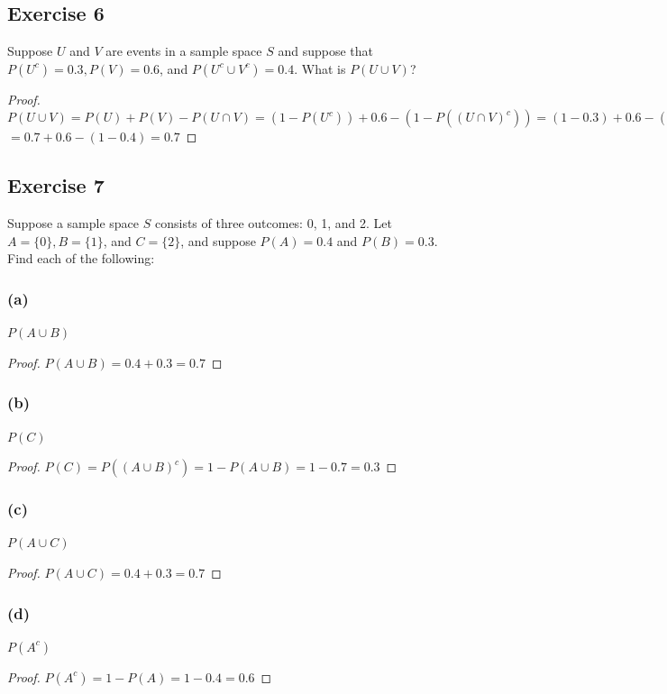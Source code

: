 \documentclass[14pt]{extarticle}
\begin{document}
\subsection{Exercise 6}
Suppose \(U\) and \(V\) are events in a sample space \(S\) and suppose that \(P(U^c) = 0.3, P(V) = 0.6\), and \(P(U^c \cup
V^c) = 0.4\). What is \(P(U \cup V)\)?

\begin{proof}
     \(P(U \cup V) = P(U) + P(V) - P(U \cap V) = (1-P(U^c)) + 0.6 - (1 - P((U \cap V)^c)) = (1-0.3) + 0.6 - (1-P(U^c \cup V^c))\)
     \(= 0.7 + 0.6 - (1-0.4) = 0.7\)
\end{proof}

\subsection{Exercise 7}
Suppose a sample space \(S\) consists of three outcomes: 0, 1, and 2. Let \(A = \{0\}, B = \{1\}\), and \(C = \{2\}\), and
suppose \(P(A) = 0.4\) and \(P(B) = 0.3\). Find each of the following:

\subsubsection{(a)}
\(P(A \cup B)\)
\begin{proof}
     \(P(A \cup B) = 0.4 + 0.3 = 0.7\)
\end{proof}

\subsubsection{(b)}
\(P(C)\)
\begin{proof}
     \(P(C) = P((A \cup B)^c) = 1 - P(A \cup B) = 1 - 0.7 = 0.3\)
\end{proof}

\subsubsection{(c)}
\(P(A \cup C)\)
\begin{proof}
     \(P(A \cup C) = 0.4 + 0.3 = 0.7\)
\end{proof}

\subsubsection{(d)}
\(P(A^c)\)
\begin{proof}
     \(P(A^c) = 1 - P(A) = 1 - 0.4 = 0.6\)
\end{proof}
\end{document}
